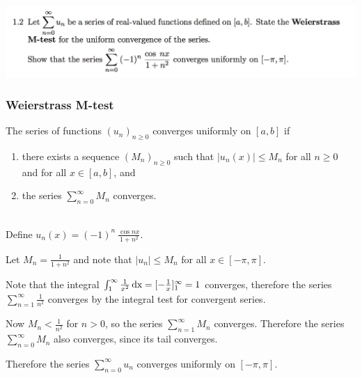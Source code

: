 \documentclass[12pt]{article}
\begin{document}
\subsection*{} %
\includegraphics[width=400pt]{img/differential-equations-a1-1-2.png}\\
\begin{mdframed}
\subsubsection*{Weierstrass M-test}
The series of functions $(u_n)_{n\geq 0}$ converges uniformly on $[a,b]$ if
\begin{enumerate}
\item there exists a sequence $(M_n)_{n\geq 0}$ such that $|u_n(x)| \leq M_n$
  for all $n \geq 0$ and for all $x \in [a,b]$, and
\item the series $\sum_{n=0}^\infty M_n$ converges.
\end{enumerate}
~\\
Define $u_n(x) = (-1)^n ~ \frac{\cos nx}{1 + n^2}$.

Let $M_n = \frac{1}{1 + n^2}$ and note that $|u_n| \leq M_n$ for all
$x \in [-\pi,\pi]$.

Note that the integral
$\int_1^\infty \frac{1}{x^2} \operatorname{\text{dx}} = [-\frac{1}{x}]_1^\infty = 1$ converges,
therefore the series $\sum_{n=1}^\infty \frac{1}{n^2}$ converges by the
integral test for convergent series.

Now $M_n < \frac{1}{n^2}$ for $n > 0$, so the series $\sum_{n=1}^\infty M_n$
converges. Therefore the series $\sum_{n=0}^\infty M_n$ also converges, since
its tail converges.

Therefore the series $\sum_{n=0}^\infty u_n$ converges uniformly on
$[-\pi,\pi]$.


\end{mdframed}
\end{document}
